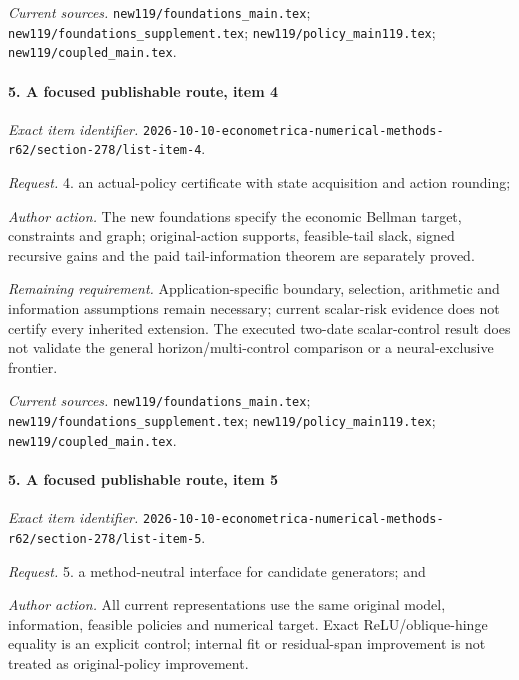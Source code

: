 \par\emph{Current sources.} \nolinkurl{new119/foundations_main.tex}; \nolinkurl{new119/foundations_supplement.tex}; \nolinkurl{new119/policy_main119.tex}; \nolinkurl{new119/coupled_main.tex}.

\paragraph{5. A focused publishable route, item 4}

\emph{Exact item identifier.} \nolinkurl{2026-10-10-econometrica-numerical-methods-r62/section-278/list-item-4}.

\par\emph{Request.} 4. an actual-policy certificate with state acquisition and action rounding;

\par\emph{Author action.} The new foundations specify the economic Bellman target, constraints and graph; original-action supports, feasible-tail slack, signed recursive gains and the paid tail-information theorem are separately proved.

\par\emph{Remaining requirement.} Application-specific boundary, selection, arithmetic and information assumptions remain necessary; current scalar-risk evidence does not certify every inherited extension. The executed two-date scalar-control result does not validate the general horizon/\allowbreak{}multi-control comparison or a neural-exclusive frontier.

\par\emph{Current sources.} \nolinkurl{new119/foundations_main.tex}; \nolinkurl{new119/foundations_supplement.tex}; \nolinkurl{new119/policy_main119.tex}; \nolinkurl{new119/coupled_main.tex}.

\paragraph{5. A focused publishable route, item 5}

\emph{Exact item identifier.} \nolinkurl{2026-10-10-econometrica-numerical-methods-r62/section-278/list-item-5}.

\par\emph{Request.} 5. a method-neutral interface for candidate generators; and

\par\emph{Author action.} All current representations use the same original model, information, feasible policies and numerical target. Exact ReLU/\allowbreak{}oblique-hinge equality is an explicit control; internal fit or residual-span improvement is not treated as original-policy improvement.

